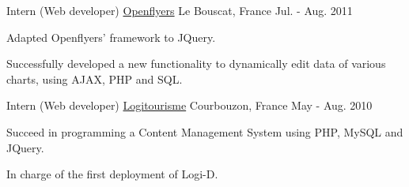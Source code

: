 \begin{cventries}
		\cventry
			{Intern (Web developer)}
			{\href{https://openflyers.com/}{Openflyers}}
			{Le Bouscat, France}
			{Jul. - Aug. 2011}
			{
				\begin{cvitems}
					\item Adapted Openflyers' framework to JQuery.
					\item Successfully developed a new functionality to dynamically edit data of various charts, using AJAX, PHP and SQL.
				\end{cvitems}
			}
		
		\cventry
			{Intern (Web developer)}
			{\href{https://www.logitourisme.com/}{Logitourisme}}
			{Courbouzon, France}
			{May - Aug. 2010}
			{
				\begin{cvitems}
					\item Succeed in programming a Content Management System using PHP, MySQL and JQuery.
					\item In charge of the first deployment of Logi-D. 
				\end{cvitems}
			}
	
	\end{cventries}